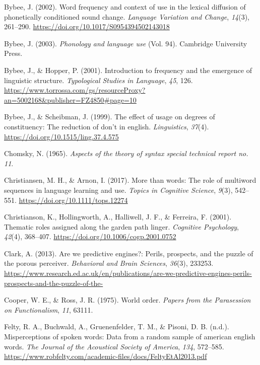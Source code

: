 \documentclass[
  12pt,
  letterpaper,
]{scrreprt}
\newlength{\cslhangindent}
\newenvironment{CSLReferences}[2] %
 {\begin{list}{}{%
  \setlength{\itemindent}{0pt}
  \setlength{\leftmargin}{0pt}
  \setlength{\parsep}{0pt}
  \ifodd #1
   \setlength{\leftmargin}{\cslhangindent}
   \setlength{\itemindent}{-1\cslhangindent}
  \fi
  \setlength{\itemsep}{#2\baselineskip}}}
 {\end{list}}
\begin{document}
\begin{CSLReferences}{1}{0}
Bybee, J. (2002). Word frequency and context of use in the lexical
diffusion of phonetically conditioned sound change. \emph{Language
Variation and Change}, \emph{14}(3), 261--290.
\url{https://doi.org/10.1017/S0954394502143018}

Bybee, J. (2003). \emph{Phonology and language use} (Vol. 94). Cambridge
University Press.

Bybee, J., \& Hopper, P. (2001). Introduction to frequency and the
emergence of linguistic structure. \emph{Typological Studies in
Language}, \emph{45}, 126.
\url{https://www.torrossa.com/gs/resourceProxy?an=5002168&publisher=FZ4850\#page=10}

Bybee, J., \& Scheibman, J. (1999). The effect of usage on degrees of
constituency: The reduction of don't in english. \emph{Linguistics},
\emph{37}(4). \url{https://doi.org/10.1515/ling.37.4.575}

Chomsky, N. (1965). \emph{Aspects of the theory of syntax special
technical report no. 11}.

Christiansen, M. H., \& Arnon, I. (2017). More than words: The role of
multiword sequences in language learning and use. \emph{Topics in
Cognitive Science}, \emph{9}(3), 542--551.
\url{https://doi.org/10.1111/tops.12274}

Christianson, K., Hollingworth, A., Halliwell, J. F., \& Ferreira, F.
(2001). Thematic roles assigned along the garden path linger.
\emph{Cognitive Psychology}, \emph{42}(4), 368--407.
\url{https://doi.org/10.1006/cogp.2001.0752}

Clark, A. (2013). Are we predictive engines?: Perils, prospects, and the
puzzle of the porous perceiver. \emph{Behavioral and Brain Sciences},
\emph{36}(3), 233253.
\url{https://www.research.ed.ac.uk/en/publications/are-we-predictive-engines-perils-prospects-and-the-puzzle-of-the-}

Cooper, W. E., \& Ross, J. R. (1975). World order. \emph{Papers from the
Parasession on Functionalism}, \emph{11}, 63111.

Felty, R. A., Buchwald, A., Gruenenfelder, T. M., \& Pisoni, D. B.
(n.d.). Misperceptions of spoken words: Data from a random sample of
american english words. \emph{The Journal of the Acoustical Society of
America}, \emph{134}, 572--585.
\url{https://www.robfelty.com/academic-files/docs/FeltyEtAl2013.pdf}


\end{CSLReferences}
\end{document}
